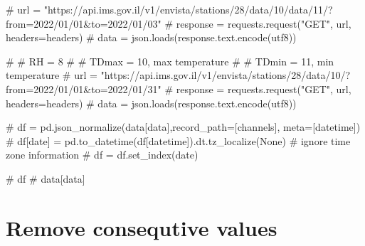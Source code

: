 \documentclass[
  letterpaper,
  DIV=11,
  numbers=noendperiod,
  oneside]{scrreprt}
\newenvironment{Shaded}{\begin{snugshade}}{\end{snugshade}}
\newcommand{\CommentTok}[1]{\textcolor[rgb]{0.37,0.37,0.37}{#1}}
\begin{document}
\begin{Shaded}
\begin{Highlighting}[]
\CommentTok{\# url = "https://api.ims.gov.il/v1/envista/stations/28/data/10/data/11/?from=2022/01/01\&to=2022/01/03"}
\CommentTok{\# response = requests.request("GET", url, headers=headers)}
\CommentTok{\# data = json.loads(response.text.encode(\textquotesingle{}utf8\textquotesingle{}))}
\end{Highlighting}
\end{Shaded}

\begin{Shaded}
\begin{Highlighting}[]
\CommentTok{\# \# RH = 8}
\CommentTok{\# \# TDmax = 10, max temperature}
\CommentTok{\# \# TDmin = 11, min temperature}
\CommentTok{\# url = "https://api.ims.gov.il/v1/envista/stations/28/data/10/?from=2022/01/01\&to=2022/01/31"}
\CommentTok{\# response = requests.request("GET", url, headers=headers)}
\CommentTok{\# data = json.loads(response.text.encode(\textquotesingle{}utf8\textquotesingle{}))}

\CommentTok{\# df = pd.json\_normalize(data[\textquotesingle{}data\textquotesingle{}],record\_path=[\textquotesingle{}channels\textquotesingle{}], meta=[\textquotesingle{}datetime\textquotesingle{}])}
\CommentTok{\# df[\textquotesingle{}date\textquotesingle{}] = pd.to\_datetime(df[\textquotesingle{}datetime\textquotesingle{}]).dt.tz\_localize(None)  \# ignore time zone information}
\CommentTok{\# df = df.set\_index(\textquotesingle{}date\textquotesingle{})}

\CommentTok{\# df}
\CommentTok{\# data[\textquotesingle{}data\textquotesingle{}]}
\end{Highlighting}
\end{Shaded}

\hypertarget{remove-consequtive-values}{%
\chapter{Remove consequtive values}\label{remove-consequtive-values}}
\end{document}
